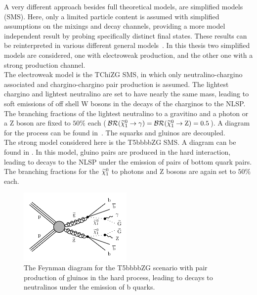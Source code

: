 \begin{enumerate}
\begin{figure}[tbp]
 \label{fig:ewkSMS}
\end{figure}
A very different approach besides full theoretical models, are simplified models (SMS)\cite{SMS}. Here, only a limited particle content is assumed with simplified assumptions on the mixings and decay channels, providing a more model independent result by probing specifically distinct final states. These results can be reinterpreted in various different general models~\cite{SMSReInt}. In this thesis two simplified models are considered, one with electroweak production, and the other one with a strong production channel.\\
The electroweak model is the TChiZG SMS, in which only neutralino-chargino associated and chargino-chargino pair production is assumed. The lightest chargino and lightest neutralino are set to have nearly the same mass, leading to soft emissions of off shell W bosons in the decays of the charginos to the NLSP. The branching fractions of the lightest neutralino to a gravitino and a photon or a Z boson are fixed to $50\%$ each ($\mathcal{BR}(\widetilde{\chi}^{0}_{1}\to\gamma)=\mathcal{BR}(\widetilde{\chi}^{0}_{1}\to\mathrm{Z})=0.5$). A diagram for the process can be found in~. The squarks and gluinos are decoupled.\\
The strong model considered here is the T5bbbbZG SMS. A diagram can be found in . In this model, gluino pairs are produced in the hard interaction, leading to decays to the NLSP under the emission of pairs of bottom quark pairs. The branching fractions for the $\widetilde{\chi}^{0}_{1}$ to photons and Z bosons are again set to $50\%$ each.

\begin{figure}[tbp]
 \centering
 \includegraphics[width=0.49\textwidth]{figures/signal/T5bbbbZG-crop}
 \caption{The Feynman diagram for the T5bbbbZG scenario with pair production of gluinos in the hard process, leading to decays to neutralinos under the emission of b quarks.}
 \label{fig:strongSMS}
\end{figure}



\end{enumerate}
